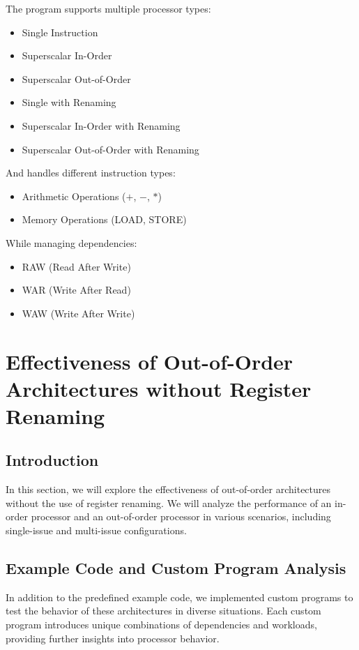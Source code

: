 \documentclass{article}
\begin{document}
\noindent The program supports multiple processor types:
\begin{itemize}
    \item Single Instruction
    \item Superscalar In-Order
    \item Superscalar Out-of-Order
    \item Single with Renaming
    \item Superscalar In-Order with Renaming
    \item Superscalar Out-of-Order with Renaming
\end{itemize}

\noindent And handles different instruction types:
\begin{itemize}
    \item Arithmetic Operations ($+$, $-$, $*$)
    \item Memory Operations (LOAD, STORE)
\end{itemize}

\noindent While managing dependencies:
\begin{itemize}
    \item RAW (Read After Write)
    \item WAR (Write After Read)
    \item WAW (Write After Write)
\end{itemize}
\section{Effectiveness of Out-of-Order Architectures without Register Renaming}
\subsection{Introduction}
In this section, we will explore the effectiveness of out-of-order architectures without the use of register renaming. We will analyze the performance of an in-order processor and an out-of-order processor in various scenarios, including single-issue and multi-issue configurations.
\subsection{Example Code and Custom Program Analysis}
In addition to the predefined example code, we implemented custom programs to test the behavior of these architectures in diverse situations. Each custom program introduces unique combinations of dependencies and workloads, providing further insights into processor behavior.
\end{document}
